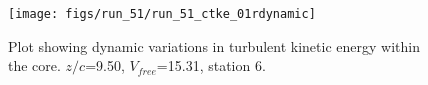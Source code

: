\begin{figure}[H]
\centering
\texttt{[image: figs/run\_51/run\_51\_ctke\_01rdynamic]}
\caption{Plot showing dynamic variations in turbulent kinetic energy within the core. $z/c$=9.50, $V_{free}$=15.31, station 6.}
\end{figure}


